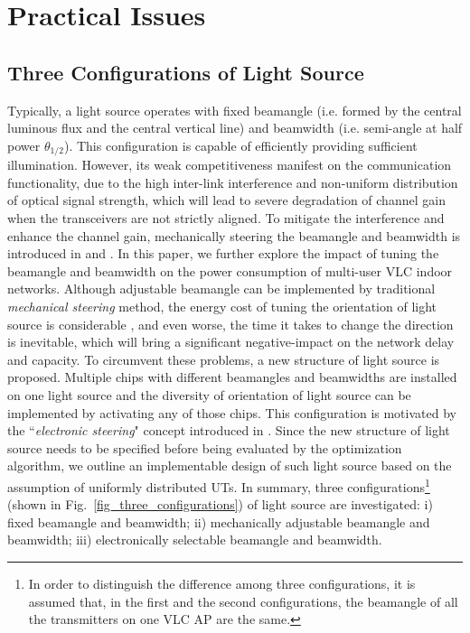 \documentclass[10pt,journal]{IEEEtran}
\begin{document}
\section{Practical Issues}\label{pracitcal_issues}


\subsection{Three Configurations of Light Source}
Typically, a light source operates with fixed beamangle (i.e. formed by the central luminous flux and the central vertical line) and beamwidth (i.e. semi-angle at half power $\theta_{1/2}$). This configuration is capable of efficiently providing sufficient illumination. However, its weak competitiveness manifest on the communication functionality, due to the high inter-link interference and non-uniform distribution of optical signal strength, which will lead to severe degradation of channel gain when the transceivers are not strictly aligned. To mitigate the interference and enhance the channel gain, mechanically steering the beamangle and beamwidth is introduced in \cite{tronghop2012modeling} and \cite{li2012vico}. In this paper, we further explore the impact of tuning the beamangle and beamwidth on the power consumption of multi-user VLC indoor networks. Although adjustable beamangle can be implemented by traditional {\it mechanical steering} method, the energy cost of tuning the orientation of light source is considerable \cite{nakhkoob2009multi}, and even worse, the time it takes to change the direction is inevitable, which will bring a significant negative-impact on the network delay and capacity. To circumvent these problems, a new structure of light source is proposed. Multiple chips with different beamangles and beamwidths are installed on one light source and the diversity of orientation of light source can be implemented by activating any of those chips. This configuration is motivated by the ``{\it electronic steering}" concept introduced in \cite{nakhkoob2009multi}. Since the new structure of light source needs to be specified before being evaluated by the optimization algorithm, we outline an implementable design of such light source based on the assumption of uniformly distributed UTs. In summary, three configurations\footnote{In order to distinguish the difference among three configurations, it is assumed that, in the first and the second configurations, the beamangle of all the transmitters on one VLC AP are the same.} (shown in Fig.~\ref{fig_three_configurations}) of light source are investigated: i) fixed beamangle and beamwidth; ii) mechanically adjustable beamangle and beamwidth; iii) electronically selectable beamangle and beamwidth.
\end{document}
